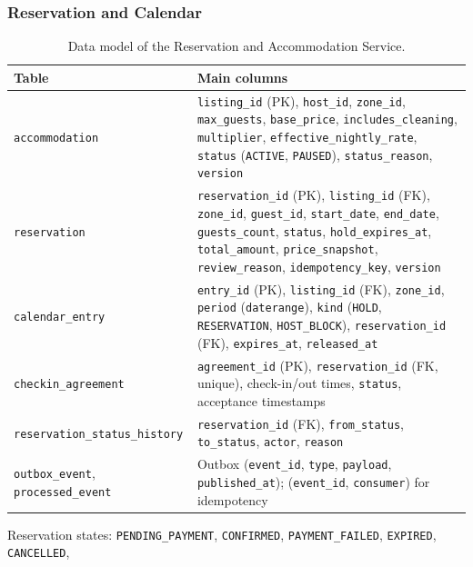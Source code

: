 \subsubsection{Reservation and Calendar}
\begin{table}[!ht]
  \centering
  \small
  \begin{tabularx}{\textwidth}{@{}>{\raggedright\arraybackslash}p{5cm}>{\raggedright\arraybackslash}X@{}}
    \toprule
    \textbf{Table} & \textbf{Main columns} \\
    \midrule
    \texttt{accommodation} & \texttt{listing\_id} (PK), \texttt{host\_id}, \texttt{zone\_id}, \texttt{max\_guests}, \texttt{base\_price}, \texttt{includes\_cleaning}, \texttt{multiplier}, \texttt{effective\_nightly\_rate}, \texttt{status} (\texttt{ACTIVE}, \texttt{PAUSED}), \texttt{status\_reason}, \texttt{version} \\
    \texttt{reservation} & \texttt{reservation\_id} (PK), \texttt{listing\_id} (FK), \texttt{zone\_id}, \texttt{guest\_id}, \texttt{start\_date}, \texttt{end\_date}, \texttt{guests\_count}, \texttt{status}, \texttt{hold\_expires\_at}, \texttt{total\_amount}, \texttt{price\_snapshot}, \texttt{review\_reason}, \texttt{idempotency\_key}, \texttt{version} \\
    \texttt{calendar\_entry} & \texttt{entry\_id} (PK), \texttt{listing\_id} (FK), \texttt{zone\_id}, \texttt{period} (\texttt{daterange}), \texttt{kind} (\texttt{HOLD}, \texttt{RESERVATION}, \texttt{HOST\_BLOCK}), \texttt{reservation\_id} (FK), \texttt{expires\_at}, \texttt{released\_at} \\
    \texttt{checkin\_agreement} & \texttt{agreement\_id} (PK), \texttt{reservation\_id} (FK, unique), check-in/out times, \texttt{status}, acceptance timestamps \\
    \texttt{reservation\_status\_history} & \texttt{reservation\_id} (FK), \texttt{from\_status}, \texttt{to\_status}, \texttt{actor}, \texttt{reason} \\
    \texttt{outbox\_event}, \texttt{processed\_event} & Outbox (\texttt{event\_id}, \texttt{type}, \texttt{payload}, \texttt{published\_at}); (\texttt{event\_id}, \texttt{consumer}) for idempotency \\
    \bottomrule
  \end{tabularx}
  \caption{Data model of the Reservation and Accommodation Service.}
\end{table}
\noindent Reservation states: \texttt{PENDING\_PAYMENT}, \texttt{CONFIRMED},
\texttt{PAYMENT\_FAILED}, \texttt{EXPIRED}, \texttt{CANCELLED},


